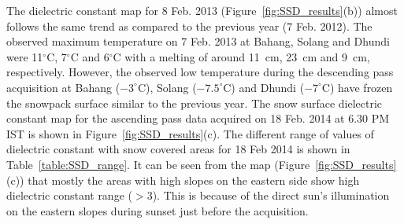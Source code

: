 The dielectric constant map for 8 Feb. 2013 (Figure~\ref{fig:SSD_results}(b)) almost follows the same trend as compared to the previous year (7 Feb. 2012). The observed maximum temperature on 7 Feb. 2013 at Bahang, Solang and Dhundi were 11$^\circ$C, 7$^\circ$C and 6$^\circ$C with a melting of around 11~cm, 23~cm and 9~cm, respectively. However, the observed low temperature during the descending pass acquisition at Bahang ($-3^\circ$C), Solang ($-7.5^\circ$C) and Dhundi ($-7^\circ$C) have frozen the snowpack surface similar to the previous year. The snow surface dielectric constant map for the ascending pass data acquired on 18 Feb. 2014 at 6.30 PM IST is shown in Figure~\ref{fig:SSD_results}(c). The different range of values of dielectric constant with snow covered areas for 18 Feb 2014 is shown in Table~\ref{table:SSD_range}. It can be seen from the map (Figure~\ref{fig:SSD_results}(c)) that mostly the areas with high slopes on the eastern side show high dielectric constant range ($>$3). This is because of the direct sun's illumination on the eastern slopes during sunset just before the acquisition. 

